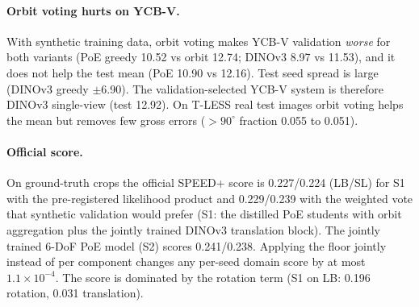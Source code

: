 
\paragraph{Orbit voting hurts on YCB-V.}
With synthetic training data, orbit voting makes YCB-V validation \emph{worse} for both variants (PoE greedy 10.52 vs orbit 12.74; DINOv3 8.97 vs 11.53), and it does not help the test mean (PoE 10.90 vs 12.16). Test seed spread is large (DINOv3 greedy $\pm$6.90). The validation-selected YCB-V system is therefore DINOv3 single-view (test 12.92). On T-LESS real test images orbit voting helps the mean but removes few gross errors ($>90^\circ$ fraction 0.055 to 0.051).

\paragraph{Official score.}
On ground-truth crops the official SPEED+ score is 0.227/0.224 (LB/SL) for S1 with the pre-registered likelihood product and 0.229/0.239 with the weighted vote that synthetic validation would prefer (S1: the distilled PoE students with orbit aggregation plus the jointly trained DINOv3 translation block). The jointly trained 6-DoF PoE model (S2) scores 0.241/0.238. Applying the floor jointly instead of per component changes any per-seed domain score by at most $1.1\times10^{-4}$. The score is dominated by the rotation term (S1 on LB: 0.196 rotation, 0.031 translation).

